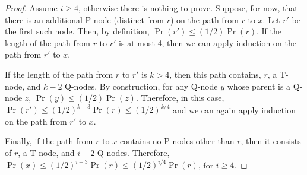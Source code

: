 \documentclass[lotsofwhite]{patmorin}
\newcommand{\prnt}{\mathrm{parent}}
\begin{document}
\begin{proof}
Assume $i\ge 4$, otherwise there is nothing to prove. 
Suppose, for now, that there is an additional P-node (distinct from $r$)
on the path from $r$ to $x$.  Let $r'$ be the first such node.  Then, by
definition, $\Pr(r')\le (1/2)\Pr(r)$. If the length of the path from $r$
to $r'$ is at most 4, then we can apply induction on the path from $r'$
to $x$.  

If the length of the path from $r$ to $r'$ is $k>4$, then this path
contains, $r$, a T-node, and $k-2$ Q-nodes.  By construction, for
any Q-node $y$ whose parent is a Q-node $z$, $\Pr(y)\le(1/2)\Pr(z)$.
Therefore, in this case, $\Pr(r') \le (1/2)^{k-3}\Pr(r)\le (1/2)^{k/4}$
and we can again apply induction on the path from $r'$ to $x$.

Finally, if the path from $r$ to $x$ contains no P-nodes other than
$r$, then it consists of $r$, a T-node, and $i-2$ Q-nodes.  Therefore,
$\Pr(x)\le (1/2)^{i-3}\Pr(r)\le (1/2)^{i/4}\Pr(r)$, for $i\ge 4$.
\end{proof}
%
%
%
\end{document}
